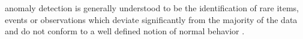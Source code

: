 anomaly detection is generally understood to be the identification of rare items, events or observations which deviate significantly from the majority of the data and do not conform to a well defined notion of normal behavior .